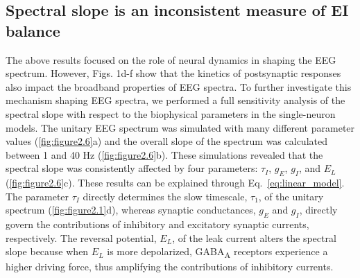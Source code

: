 \subsection{Spectral slope is an inconsistent measure of EI balance}
The above results focused on the role of neural dynamics in shaping the EEG spectrum. However, Figs. 1d-f show that the kinetics of postsynaptic responses also impact the broadband properties of EEG spectra. To further investigate this mechanism shaping EEG spectra, we performed a full sensitivity analysis of the spectral slope with respect to the biophysical parameters in the single-neuron models. The unitary EEG spectrum was simulated with many different parameter values (\autoref{fig:figure2.6}a) and the overall slope of the spectrum was calculated \cite{Donoghue2020} between 1 and 40 \unit{\hertz} (\autoref{fig:figure2.6}b). These simulations revealed that the spectral slope was consistently affected by four parameters: $\tau_I$, $g_E$, $g_I$, and $E_L$ (\autoref{fig:figure2.6}c). These results can be explained through Eq.~\ref{eq:linear_model}. The parameter $\tau_I$ directly determines the slow timescale, $\tau_1$, of the unitary spectrum (\autoref{fig:figure2.1}d), whereas synaptic conductances, $g_E$ and $g_I$, directly govern the contributions of inhibitory and excitatory synaptic currents, respectively. The reversal potential, $E_L$, of the leak current alters the spectral slope because when $E_L$ is more depolarized, GABA\textsubscript{A} receptors experience a higher driving force, thus amplifying the contributions of inhibitory currents. 


